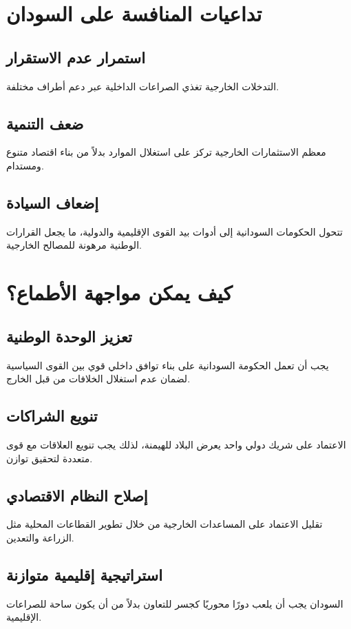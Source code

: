 \documentclass[12pt]{article}
\begin{document}
\section{تداعيات المنافسة على السودان}
\subsection{استمرار عدم الاستقرار}
التدخلات الخارجية تغذي الصراعات الداخلية عبر دعم أطراف مختلفة.

\subsection{ضعف التنمية}
معظم الاستثمارات الخارجية تركز على استغلال الموارد بدلاً من بناء اقتصاد متنوع ومستدام.

\subsection{إضعاف السيادة}
تتحول الحكومات السودانية إلى أدوات بيد القوى الإقليمية والدولية، ما يجعل القرارات الوطنية مرهونة للمصالح الخارجية.

\section{كيف يمكن مواجهة الأطماع؟}
\subsection{تعزيز الوحدة الوطنية}
يجب أن تعمل الحكومة السودانية على بناء توافق داخلي قوي بين القوى السياسية لضمان عدم استغلال الخلافات من قبل الخارج.

\subsection{تنويع الشراكات}
الاعتماد على شريك دولي واحد يعرض البلاد للهيمنة، لذلك يجب تنويع العلاقات مع قوى متعددة لتحقيق توازن.

\subsection{إصلاح النظام الاقتصادي}
تقليل الاعتماد على المساعدات الخارجية من خلال تطوير القطاعات المحلية مثل الزراعة والتعدين.

\subsection{استراتيجية إقليمية متوازنة}
السودان يجب أن يلعب دورًا محوريًا كجسر للتعاون بدلاً من أن يكون ساحة للصراعات الإقليمية.
\end{document}
